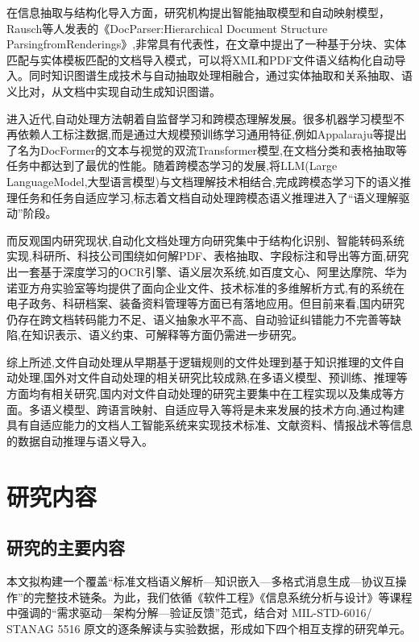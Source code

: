 在信息抽取与结构化导入方面，研究机构提出智能抽取模型和自动映射模型，Rausch等人发表的《DocParser:Hierarchical Document Structure ParsingfromRenderings》\cite{Rausch2021DocParser},非常具有代表性，在文章中提出了一种基于分块、实体匹配与实体模板匹配的文档导入模式，可以将XML和PDF文件语义结构化自动导入。同时知识图谱生成技术与自动抽取处理相融合，通过实体抽取和关系抽取、语义比对，从文档中实现自动生成知识图谱。

进入近代,自动处理方法朝着自监督学习和跨模态理解发展。很多机器学习模型不再依赖人工标注数据,而是通过大规模预训练学习通用特征,例如Appalaraju等提出了名为DocFormer的文本与视觉的双流Transformer模型\cite{Appalaraju2021DocFormer},在文档分类和表格抽取等任务中都达到了最优的性能。随着跨模态学习的发展,将LLM(Large LanguageModel,大型语言模型)与文档理解技术相结合,完成跨模态学习下的语义推理任务和任务自适应学习\cite{Wang2023DocumentLLM},标志着文档自动处理跨模态语义推理进入了“语义理解驱动”阶段。

而反观国内研究现状,自动化文档处理方向研究集中于结构化识别、智能转码系统实现,科研所、科技公司围绕如何解PDF、表格抽取、字段标注和导出等方面,研究出一套基于深度学习的OCR引擎、语义层次系统,如百度文心、阿里达摩院、华为诺亚方舟实验室等均提供了面向企业文件、技术标准的多维解析方式,有的系统在电子政务、科研档案、装备资料管理等方面已有落地应用。但目前来看,国内研究仍存在跨文档转码能力不足、语义抽象水平不高、自动验证纠错能力不完善等缺陷,在知识表示、语义约束、可解释等方面仍需进一步研究。

综上所述,文件自动处理从早期基于逻辑规则的文件处理到基于知识推理的文件自动处理,国外对文件自动处理的相关研究比较成熟,在多语义模型、预训练、推理等方面均有相关研究,国内对文件自动处理的研究主要集中在工程实现以及集成等方面。多语义模型、跨语言映射、自适应导入等将是未来发展的技术方向,通过构建具有自适应能力的文档人工智能系统来实现技术标准、文献资料、情报战术等信息的数据自动推理与语义导入。



\section{研究内容}

\subsection{研究的主要内容}

本文拟构建一个覆盖“标准文档语义解析—知识嵌入—多格式消息生成—协议互操作”的完整技术链条。为此，我们依循《软件工程》《信息系统分析与设计》等课程中强调的“需求驱动—架构分解—验证反馈”范式，结合对 MIL-STD-6016/ STANAG 5516 原文的逐条解读与实验数据，形成如下四个相互支撑的研究单元。

